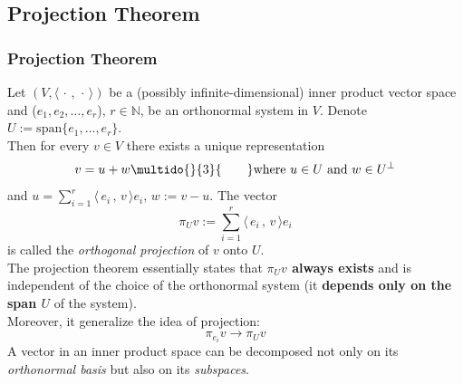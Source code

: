 \documentclass[12pt, t]{beamer}
\renewcommand{\emph}[1]{{\color{Turquoise3}\textsl{#1}}}
\newcommand{\N}{\mathbb{N}}
\newcommand{\myseries}[2]{$#1_1,#1_2,\dots,#1_#2$}
\newcommand{\nullspace}{~\\[15pt]}
\newcommand{\scp}[2]{\langle\,#1\,,\,#2\,\rangle} \newcommand{\scpp}{\langle\,\cdot\,,\,\cdot\,\rangle}
\begin{document}
\subsection{Projection Theorem}
\begin{frame}[allowframebreaks]
    \frametitle{Projection Theorem}
    Let $(V,\scpp)$ be a (possibly infinite-dimensional) inner product vector space and (\myseries{e}{r}), $r\in\N$, be an orthonormal system in $V$. Denote $U:=\text{span}\{e_1,\ldots,e_r\}.$\\
    Then for every $v\in V$ there exists a unique representation
    \begin{equation*}
        v=u+w\multido{}{3}{\qquad}\text{where}~u\in U~\text{and}~w\in U^{\perp}
    \end{equation*}
    and $u=\sum\limits_{i=1}^{r}\scp{e_i}{v}e_i,\,w:=v-u.$
    The vector
    \begin{equation*}
        \pi_Uv:=\sum_{i=1}^{r}\scp{e_i}{v}e_i
    \end{equation*}
    is called the \emph{orthogonal projection} of $v$ onto $U$.\\
    \newpage
    The projection theorem essentially states that \textbf{$\pi_Uv$ always exists} and is independent of the choice of the orthonormal system (it \textbf{depends only on the span $U$} of the system).
    \nullspace
    Moreover, it generalize the idea of projection:
    $$
        \pi_{e_i}v\rightarrow\pi_Uv
    $$
    A vector in an inner product space can be decomposed not only on its \emph{orthonormal basis} but also on its \emph{subspaces}.
\end{frame}
\end{document}
